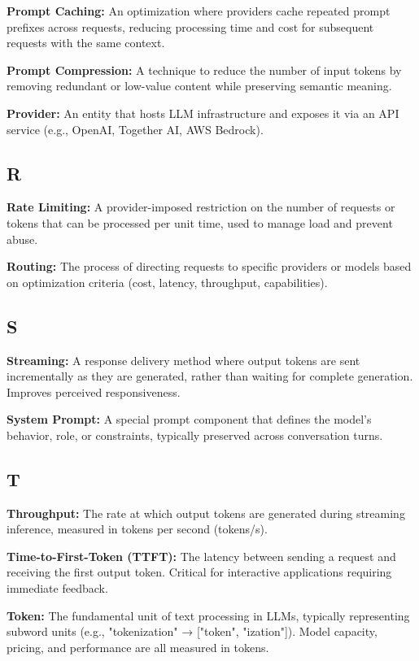 \documentclass[english]{article}
\begin{document}
\textbf{Prompt Caching:} An optimization where providers cache repeated prompt prefixes across requests, reducing processing time and cost for subsequent requests with the same context.

\textbf{Prompt Compression:} A technique to reduce the number of input tokens by removing redundant or low-value content while preserving semantic meaning.

\textbf{Provider:} An entity that hosts LLM infrastructure and exposes it via an API service (e.g., OpenAI, Together AI, AWS Bedrock).

\subsection*{R}

\textbf{Rate Limiting:} A provider-imposed restriction on the number of requests or tokens that can be processed per unit time, used to manage load and prevent abuse.

\textbf{Routing:} The process of directing requests to specific providers or models based on optimization criteria (cost, latency, throughput, capabilities).

\subsection*{S}

\textbf{Streaming:} A response delivery method where output tokens are sent incrementally as they are generated, rather than waiting for complete generation. Improves perceived responsiveness.

\textbf{System Prompt:} A special prompt component that defines the model's behavior, role, or constraints, typically preserved across conversation turns.

\subsection*{T}

\textbf{Throughput:} The rate at which output tokens are generated during streaming inference, measured in tokens per second (tokens/s).

\textbf{Time-to-First-Token (TTFT):} The latency between sending a request and receiving the first output token. Critical for interactive applications requiring immediate feedback.

\textbf{Token:} The fundamental unit of text processing in LLMs, typically representing subword units (e.g., "tokenization" → ["token", "ization"]). Model capacity, pricing, and performance are all measured in tokens.
\end{document}
